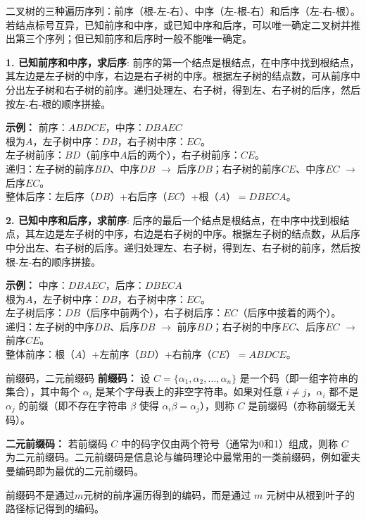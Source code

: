 \documentclass[lang=cn,11pt]{elegantbook}
\begin{document}
    \vspace{10pt}

二叉树的三种遍历序列：前序（根-左-右）、中序（左-根-右）和后序（左-右-根）。若结点标号互异，已知前序和中序，或已知中序和后序，可以唯一确定二叉树并推出第三个序列；但已知前序和后序时一般不能唯一确定。

    \textbf{1. 已知前序和中序，求后序}:
    前序的第一个结点是根结点，在中序中找到根结点，其左边是左子树的中序，右边是右子树的中序。根据左子树的结点数，可从前序中分出左子树和右子树的前序。递归处理左、右子树，得到左、右子树的后序，然后按左-右-根的顺序拼接。

    \textbf{示例：}
    前序：$ABDCE$，中序：$DBAEC$ \\
    根为$A$，左子树中序：$DB$，右子树中序：$EC$。 \\
    左子树前序：$BD$（前序中$A$后的两个），右子树前序：$CE$。 \\
    递归：左子树的前序$BD$、中序$DB$ $\to$ 后序$DB$；右子树的前序$CE$、中序$EC$ $\to$ 后序$EC$。 \\
    整体后序：左后序（$DB$）+右后序（$EC$）+根（$A$）$=DBECA$。

    \textbf{2. 已知中序和后序，求前序}:
    后序的最后一个结点是根结点，在中序中找到根结点，其左边是左子树的中序，右边是右子树的中序。根据左子树的结点数，从后序中分出左、右子树的后序。递归处理左、右子树，得到左、右子树的前序，然后按根-左-右的顺序拼接。

    \textbf{示例：}
    中序：$DBAEC$，后序：$DBECA$ \\
    根为$A$，左子树中序：$DB$，右子树中序：$EC$。 \\
    左子树后序：$DB$（后序中前两个），右子树后序：$EC$（后序中接着的两个）。 \\
    递归：左子树的中序$DB$、后序$DB$ $\to$ 前序$BD$；右子树的中序$EC$、后序$EC$ $\to$ 前序$CE$。 \\
    整体前序：根（$A$）+左前序（$BD$）+右前序（$CE$）$=ABDCE$。

\begin{definition}{前缀码，二元前缀码}
\textbf{前缀码：} 设 $C = \{\alpha_1, \alpha_2, \dots, \alpha_n\}$ 是一个码（即一组字符串的集合），其中每个 $\alpha_i$ 是某个字母表上的非空字符串。如果对任意 $i \neq j$，$\alpha_i$ 都不是 $\alpha_j$ 的前缀（即不存在字符串 $\beta$ 使得 $\alpha_i \beta = \alpha_j$），则称 $C$ 是前缀码（亦称前缀无关码）。

\textbf{二元前缀码：} 若前缀码 $C$ 中的码字仅由两个符号（通常为0和1）组成，则称 $C$ 为二元前缀码。二元前缀码是信息论与编码理论中最常用的一类前缀码，例如霍夫曼编码即为最优的二元前缀码。
\end{definition}
前缀码不是通过$m$元树的前序遍历得到的编码，而是通过 $m$ 元树中从根到叶子的路径标记得到的编码。
\end{document}
